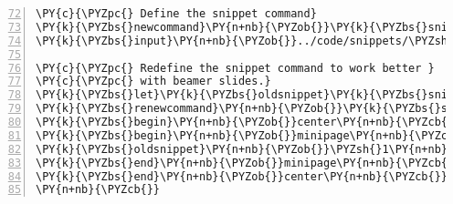 \begin{Verbatim}[commandchars=\\\{\},numbers=left,numbersep=0.5em,firstnumber=72]
\PY{c}{\PYZpc{} Define the snippet command}
\PY{k}{\PYZbs{}newcommand}\PY{n+nb}{\PYZob{}}\PY{k}{\PYZbs{}snippet}\PY{n+nb}{\PYZcb{}}[1]\PY{n+nb}{\PYZob{}}\PY{k}{\PYZbs{}begin}\PY{n+nb}{\PYZob{}}small\PY{n+nb}{\PYZcb{}}\PY{c}{\PYZpc{}}
\PY{k}{\PYZbs{}input}\PY{n+nb}{\PYZob{}}../code/snippets/\PYZsh{}1\PY{n+nb}{\PYZcb{}}\PY{k}{\PYZbs{}end}\PY{n+nb}{\PYZob{}}small\PY{n+nb}{\PYZcb{}}\PY{n+nb}{\PYZcb{}}

\PY{c}{\PYZpc{} Redefine the snippet command to work better }
\PY{c}{\PYZpc{} with beamer slides.}
\PY{k}{\PYZbs{}let}\PY{k}{\PYZbs{}oldsnippet}\PY{k}{\PYZbs{}snippet}
\PY{k}{\PYZbs{}renewcommand}\PY{n+nb}{\PYZob{}}\PY{k}{\PYZbs{}snippet}\PY{n+nb}{\PYZcb{}}[1]\PY{n+nb}{\PYZob{}}\PY{c}{\PYZpc{}}
\PY{k}{\PYZbs{}begin}\PY{n+nb}{\PYZob{}}center\PY{n+nb}{\PYZcb{}}\PY{c}{\PYZpc{}}
\PY{k}{\PYZbs{}begin}\PY{n+nb}{\PYZob{}}minipage\PY{n+nb}{\PYZcb{}}\PY{n+nb}{\PYZob{}}.8\PY{k}{\PYZbs{}linewidth}\PY{n+nb}{\PYZcb{}}\PY{c}{\PYZpc{}}
\PY{k}{\PYZbs{}oldsnippet}\PY{n+nb}{\PYZob{}}\PYZsh{}1\PY{n+nb}{\PYZcb{}}\PY{c}{\PYZpc{}}
\PY{k}{\PYZbs{}end}\PY{n+nb}{\PYZob{}}minipage\PY{n+nb}{\PYZcb{}}\PY{c}{\PYZpc{}}
\PY{k}{\PYZbs{}end}\PY{n+nb}{\PYZob{}}center\PY{n+nb}{\PYZcb{}}\PY{c}{\PYZpc{}}
\PY{n+nb}{\PYZcb{}}
\end{Verbatim}
